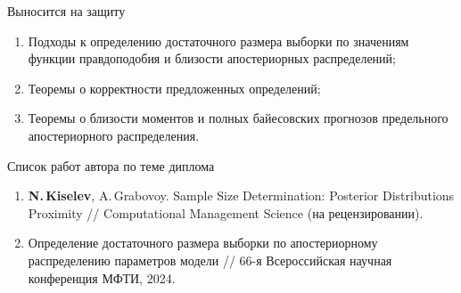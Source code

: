 \documentclass{beamer}
\begin{document}
\begin{frame}{Выносится на защиту}
    \begin{enumerate}
        \item Подходы к определению достаточного размера выборки по
        значениям функции правдоподобия и близости апостериорных распределений; 
        \item Теоремы о корректности предложенных определений;
        \item Теоремы о близости моментов и полных байесовских прогнозов предельного апостериорного распределения.
    \end{enumerate}
    \begin{block}{Список работ автора по теме диплома}
        \begin{enumerate}
        \item \textbf{N.\,Kiselev}, A.\,Grabovoy. Sample Size Determination: Posterior Distributions Proximity // Computational Management Science (на рецензировании).
        \item Определение достаточного размера выборки по апостериорному распределению параметров модели // 66-я Всероссийская научная конференция МФТИ, 2024.
        \end{enumerate}
    \end{block}
\end{frame}
\end{document}

